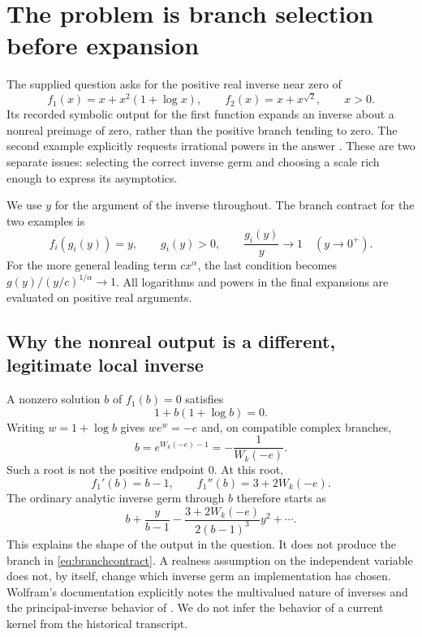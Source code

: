 \documentclass[11pt,a4paper]{article}
\numberwithin{equation}{section}
\theoremstyle{definition}\newtheorem{definition}[theorem]{Definition}
\theoremstyle{remark}\newtheorem{remark}[theorem]{Remark}
\newcommand{\code}[1]{\texttt{\detokenize{#1}}}
\begin{document}
\section{The problem is branch selection before expansion}
\label{sec:problem}
The supplied question asks for the positive real inverse near zero of
\begin{equation}\label{eq:two}
f_1(x)=x+x^2(1+\log x),\qquad f_2(x)=x+x^{\sqrt2},\qquad x>0.
\end{equation}
Its recorded symbolic output for the first function expands an inverse about a nonreal preimage of zero, rather than the positive branch tending to zero. The second example explicitly requests irrational powers in the answer \cite{question}. These are two separate issues: selecting the correct inverse germ and choosing a scale rich enough to express its asymptotics.

We use $y$ for the argument of the inverse throughout. The branch contract for the two examples is
\begin{equation}\label{eq:branchcontract}
f_i(g_i(y))=y,\qquad g_i(y)>0,\qquad \frac{g_i(y)}y\longrightarrow1
\quad(y\to0^+).
\end{equation}
For the more general leading term $cx^\alpha$, the last condition becomes
$g(y)/(y/c)^{1/\alpha}\to1$. All logarithms and powers in the final expansions are evaluated on positive real arguments.

\subsection{Why the nonreal output is a different, legitimate local inverse}
A nonzero solution $b$ of $f_1(b)=0$ satisfies
\[
1+b(1+\log b)=0.
\]
Writing $w=1+\log b$ gives $we^w=-e$ and, on compatible complex branches,
\begin{equation}\label{eq:complexroot}
b=e^{W_k(-e)-1}=-\frac1{W_k(-e)}.
\end{equation}
Such a root is not the positive endpoint $0$. At this root,
\[
f_1'(b)=b-1,\qquad f_1''(b)=3+2W_k(-e).
\]
The ordinary analytic inverse germ through $b$ therefore starts as
\begin{equation}
b+\frac{y}{b-1}-\frac{3+2W_k(-e)}{2(b-1)^3}y^2+\cdots.
\end{equation}
This explains the shape of the output in the question. It does not produce the branch in \eqref{eq:branchcontract}. A realness assumption on the independent variable does not, by itself, change which inverse germ an implementation has chosen. Wolfram's documentation explicitly notes the multivalued nature of inverses and the principal-inverse behavior of \code{InverseFunction} \cite{wlinverse}. We do not infer the behavior of a current kernel from the historical transcript.
\end{document}
